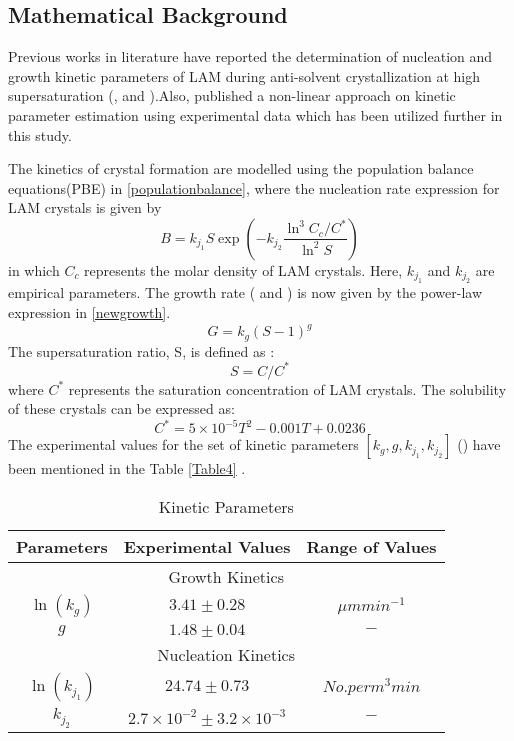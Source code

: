 \documentclass[3p,times,authoryear]{elsarticle}
\begin{document}
\subsection{Mathematical Background}


Previous works in literature have reported the determination of nucleation and growth kinetic parameters of LAM during anti-solvent crystallization at high supersaturation (\cite{lindenberg}, \cite{mahajan1994nucleation} and \cite{zarkadas2006antisolvent}).Also, \cite{bhoi} published a non-linear approach on kinetic parameter estimation using experimental data which has been utilized further in this study.

The kinetics of crystal formation are modelled using the population balance equations(PBE) in \ref{populationbalance}, where the nucleation rate expression for LAM crystals is given by 
\begin{equation}
B = k_{j_{1}}S\exp\left( -k_{j_{2}}\frac{\ln^{3}{C_{c}/C^{*}}}{\ln^{2}S}\right) 
\end{equation}
in which $C_{c}$ represents the  molar density of LAM crystals. Here, $k_{j_{1}}$ and $k_{j_{2}}$ are
empirical parameters. The growth rate (\cite{nagy} and \cite{nagy2}) is now given by the power-law expression in \ref{newgrowth}. 
\begin{equation}
G = k_{g}(S-1)^{g} \label{newgrowth}
\end{equation}
The supersaturation ratio, S, is defined as :
\begin{equation}
S = C/C^{*}
\end{equation}
where $C^{*}$ represents the saturation concentration of LAM crystals. The solubility of these crystals can be expressed as:
\begin{equation}
C^{*} = 5 \times 10^{-5}T^{2} - 0.001T + 0.0236
\end{equation}
The experimental values for the set of kinetic parameters $[k_{g}, g, k_{j_{1}}, k_{j_{2}}]$ (\cite{bhoi}) have been mentioned in the Table \ref{Table4} .

\begin{center}
\begin{table}[!h]
\centering 
\caption{Kinetic Parameters} \label{Table4}
\begin{tabular}{|c|c|c|}
\hline
Parameters & Experimental Values & Range of Values\\
\hline
\multicolumn{3}{|c|}{Growth Kinetics} \\
\hline
$\ln(k_{g})$ & $3.41\pm 0.28$ & $\mu m min^{-1} $\\
$g$ & $1.48\pm 0.04$ & $ - $\\
\hline
\multicolumn{3}{|c|}{Nucleation Kinetics} \\
\hline
$\ln(k_{j_{1}})$ & $24.74\pm0.73$ & $No. per m^{3}min$\\ 
$k_{j_{2}}$ & $2.7\times10^{-2}\pm 3.2\times10^{-3}$ & $-$\\
\hline
\end{tabular}

\label{values}
\end{table}
\end{center}
\end{document}
